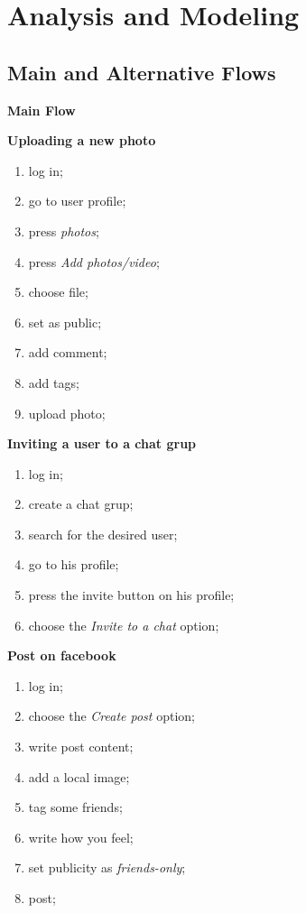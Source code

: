 \documentclass{article}
\begin{document}
	\section{Analysis and Modeling}
		\subsection{Main and Alternative Flows}
			\begin{center}
				\textbf{Main Flow}
			\end{center}

				\textbf{Uploading a new photo}
				\begin{enumerate}
					\item log in;
					\item go to user profile;
					\item press \textit{photos};
					\item press \textit{Add photos/video};
					\item choose file;
					\item set as public;
					\item add comment;
					\item add tags;
					\item upload photo;
				\end{enumerate}

				\textbf{Inviting a user to a chat grup}
				\begin{enumerate}
					\item log in;
					\item create a chat grup;
					\item search for the desired user;
					\item go to his profile;
					\item press the invite button on his profile;
					\item choose the \textit{Invite to a chat} option;
				\end{enumerate}

				\textbf{Post on facebook}
				\begin{enumerate}
					\item log in;
					\item choose the \textit{Create post} option;
					\item write post content;
					\item add a local image;
					\item tag some friends;
					\item write how you feel;
					\item set publicity as \textit{friends-only};
					\item post;
				\end{enumerate}
\end{document}
